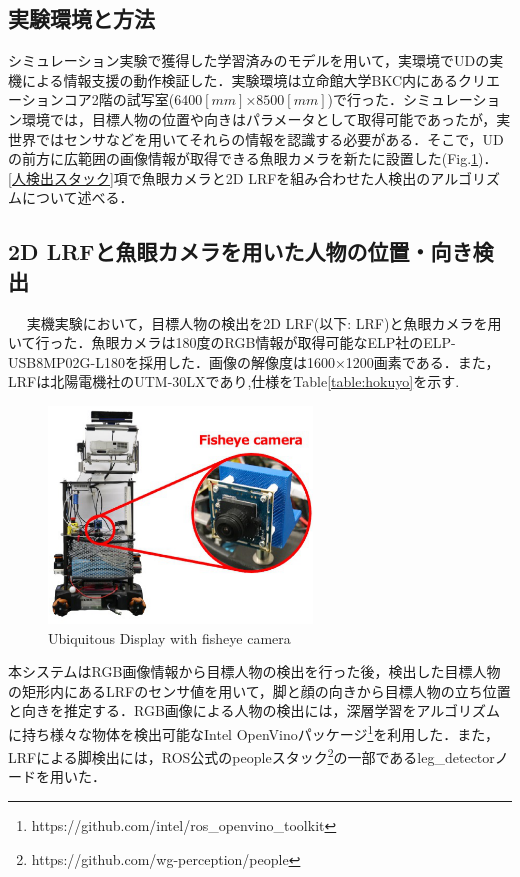 \documentclass[12pt]{sonota/aislab}
\begin{document}
\subsection{実験環境と方法}
シミュレーション実験で獲得した学習済みのモデルを用いて，実環境でUDの実機による情報支援の動作検証した．実験環境は立命館大学BKC内にあるクリエーションコア2階の試写室($6400[mm]$×$8500[mm]$)で行った．シミュレーション環境では，目標人物の位置や向きはパラメータとして取得可能であったが，実世界ではセンサなどを用いてそれらの情報を認識する必要がある．そこで，UDの前方に広範囲の画像情報が取得できる魚眼カメラを新たに設置した(Fig.\ref{ud_with_fisheyecamera})．\ref{人検出スタック}項で魚眼カメラと2D LRFを組み合わせた人検出のアルゴリズムについて述べる．

\subsection{2D LRFと魚眼カメラを用いた人物の位置・向き検出}　\label{人検出スタック}
実機実験において，目標人物の検出を2D LRF(以下: LRF)と魚眼カメラを用いて行った．魚眼カメラは180度のRGB情報が取得可能なELP社のELP-USB8MP02G-L180を採用した．画像の解像度は1600×1200画素である．また，LRFは北陽電機社のUTM-30LXであり,仕様をTable\ref{table:hokuyo}を示す.

\begin{figure}[t]
\begin{center}
\includegraphics[clip, width=7cm]{figs/ud_with_fisheyecamera.eps}
\caption{Ubiquitous Display with fisheye camera}
\label{ud_with_fisheyecamera}
\end{center}
\end{figure}

本システムはRGB画像情報から目標人物の検出を行った後，検出した目標人物の矩形内にあるLRFのセンサ値を用いて，脚と顔の向きから目標人物の立ち位置と向きを推定する．RGB画像による人物の検出には，深層学習をアルゴリズムに持ち様々な物体を検出可能なIntel OpenVinoパッケージ\footnote{https://github.com/intel/ros\_openvino\_toolkit}を利用した．また，LRFによる脚検出には，ROS公式のpeopleスタック\footnote{https://github.com/wg-perception/people}の一部であるleg\_detectorノードを用いた．
\end{document}
